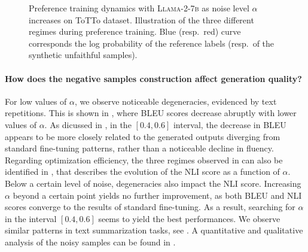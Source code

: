 \begin{figure*}
  \centering
  \hspace{1em}
  \hspace{1em}
  \caption{Preference training dynamics with \textsc{Llama-2-7b} as noise level $\alpha$ increases on ToTTo dataset. Illustration of the three different regimes during preference training. Blue (resp.\ red) curve corresponds the log probability of the reference labels (resp.\ of the synthetic unfaithful samples).}
  
  \label{fig:train_alpha}
\end{figure*}

\paragraph{How does the negative samples construction affect generation quality?}
For low values of $\alpha$, we observe noticeable degeneracies, evidenced by text repetitions. This is shown in , where BLEU scores decrease abruptly with lower values of $\alpha$. As dicussed in , in the $[0.4, 0.6]$ interval, the decrease in BLEU appears to be more closely related to the generated outputs diverging from standard fine-tuning patterns, rather than a noticeable decline in fluency.
Regarding optimization efficiency, the three regimes observed in  can also be identified in , that describes the evolution of the NLI score as a function of $\alpha$. Below a certain level of noise, degeneracies also impact the NLI score. Increasing $\alpha$ beyond a certain point yields no further improvement, as both BLEU and NLI scores converge to the results of standard fine-tuning. As a result, searching for $\alpha$ in the interval $[0.4, 0.6]$ seems to yield the best performances. We observe similar patterns in text summarization tasks, see . A quantitative and qualitative analysis of the noisy samples can be found in .

